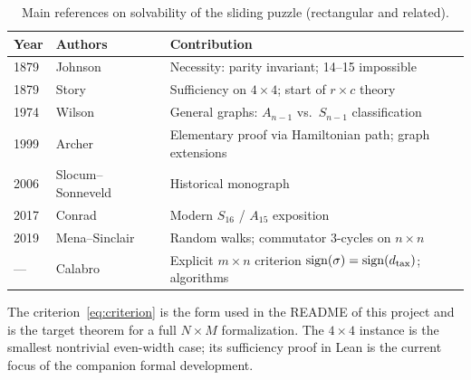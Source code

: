 \begin{table}[h]
  \centering
  \caption{Main references on solvability of the sliding puzzle (rectangular and related).}
  \label{tab:timeline}
  \small
  \begin{tabular}{@{}llp{6.8cm}@{}}
    \toprule
    Year & Authors & Contribution \\
    \midrule
    1879 & Johnson~\cite{JohnsonStory1879} & Necessity: parity invariant; 14--15 impossible \\
    1879 & Story~\cite{JohnsonStory1879} & Sufficiency on $4\times 4$; start of $r\times c$ theory \\
    1974 & Wilson~\cite{Wilson1974} & General graphs: $A_{n-1}$ vs.\ $S_{n-1}$ classification \\
    1999 & Archer~\cite{Archer1999} & Elementary proof via Hamiltonian path; graph extensions \\
    2006 & Slocum--Sonneveld~\cite{SlocumSonneveld2006} & Historical monograph \\
    2017 & Conrad~\cite{Conrad15Puzzle} & Modern $S_{16}$ / $A_{15}$ exposition \\
    2019 & Mena--Sinclair~\cite{MenaSinclair2019} & Random walks; commutator $3$-cycles on $n\times n$ \\
    ---  & Calabro~\cite{Calabro15Puzzle} & Explicit $m\times n$ criterion $\operatorname{sign}(\sigma)=\operatorname{sign}(d_{\mathrm{tax}})$; algorithms \\
    \bottomrule
  \end{tabular}
\end{table}

The criterion~\eqref{eq:criterion} is the form used in the README of this project and is the target theorem for a full $N\times M$ formalization.
The $4\times 4$ instance is the smallest nontrivial even-width case; its sufficiency proof in Lean is the current focus of the companion formal development.
